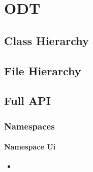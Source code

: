 \documentclass[letterpaper,10pt,english]{sphinxmanual}
\begin{document}
\sphinxstepscope


\chapter{ODT}
\label{\detokenize{api/library_root:odt}}\label{\detokenize{api/library_root::doc}}

\section{Class Hierarchy}
\label{\detokenize{api/library_root:class-hierarchy}}



\section{File Hierarchy}
\label{\detokenize{api/library_root:file-hierarchy}}



\section{Full API}
\label{\detokenize{api/library_root:full-api}}

\subsection{Namespaces}
\label{\detokenize{api/library_root:namespaces}}
\sphinxstepscope


\subsubsection{Namespace Ui}
\label{\detokenize{api/namespace_Ui:namespace-ui}}\label{\detokenize{api/namespace_Ui:id1}}\label{\detokenize{api/namespace_Ui::doc}}
\begin{sphinxShadowBox}
\begin{itemize}
\item {} 
\sphinxAtStartPar
{}\label{\detokenize{api/namespace_Ui:id2}}{\hyperref[\detokenize{api/namespace_Ui:classes}]{}}

\end{itemize}
\end{sphinxShadowBox}
\end{document}
